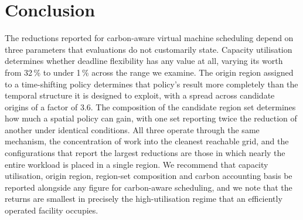 \documentclass[11pt,a4paper]{article}
\begin{document}









\section{Conclusion}
\label{sec:conclusion}

The reductions reported for carbon-aware virtual machine scheduling depend on
three parameters that evaluations do not customarily state. Capacity
utilisation determines whether deadline flexibility has any value at all,
varying its worth from 32\,\% to under 1\,\% across the range we examine. The
origin region assigned to a time-shifting policy determines that policy's result
more completely than the temporal structure it is designed to exploit, with a
spread across candidate origins of a factor of 3.6. The composition of the
candidate region set determines how much a spatial policy can gain, with one set
reporting twice the reduction of another under identical conditions. All three
operate through the same mechanism, the concentration of work into the cleanest
reachable grid, and the configurations that report the largest reductions are
those in which nearly the entire workload is placed in a single region. We
recommend that capacity utilisation, origin region, region-set composition and
carbon accounting basis be reported alongside any figure for carbon-aware
scheduling, and we note that the returns are smallest in precisely the
high-utilisation regime that an efficiently operated facility occupies.



\end{document}
